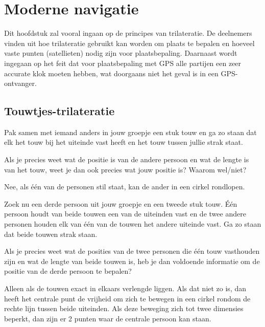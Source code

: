\chapter{Moderne navigatie}

Dit hoofdstuk zal vooral ingaan op de principes van trilateratie. De deelnemers vinden uit hoe trilateratie gebruikt kan worden om plaats te bepalen en hoeveel vaste punten (satellieten) nodig zijn voor plaatsbepaling. Daarnaast wordt ingegaan op het feit dat voor plaatsbepaling met GPS alle partijen een zeer accurate klok moeten hebben, wat doorgaans niet het geval is in een GPS-ontvanger.

\section{Touwtjes-trilateratie}

\begin{opgave}
	Pak samen met iemand anders in jouw groepje een stuk touw en ga zo staan dat elk het touw bij het uiteinde vast heeft en het touw tussen jullie strak staat.

	Als je precies weet wat de positie is van de andere persoon en wat de lengte is van het touw, weet je dan ook precies wat jouw positie is? Waarom wel/niet?
	\begin{antwoord}
		Nee, als \'e\'en van de personen stil staat, kan de ander in een cirkel rondlopen.
	\end{antwoord}
\end{opgave}

\begin{opgave}
	Zoek nu een derde persoon uit jouw groepje en een tweede stuk touw. \'E\'en persoon houdt van beide touwen een van de uiteinden vast en de twee andere personen houden elk van \'e\'en van de touwen het andere uiteinde vast. Ga zo staan dat beide touwen strak staan.

	Als je precies weet wat de posities van de twee personen die \'e\'en touw vasthouden zijn en wat de lengte van beide touwen is, heb je dan voldoende informatie om de positie van de derde persoon te bepalen?
	\begin{antwoord}
		Alleen als de touwen exact in elkaars verlengde liggen. Als dat niet zo is, dan heeft het centrale punt de vrijheid om zich te bewegen in een cirkel rondom de rechte lijn tussen beide uiteinden. Als deze beweging zich tot twee dimensies beperkt, dan zijn er 2 punten waar de centrale persoon kan staan.
	\end{antwoord}
\end{opgave}

